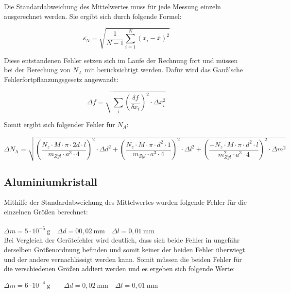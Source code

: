 \documentclass[12pt,a4paper,titlepage,headinclude,bibtotoc]{scrartcl}
\begin{document}
Die Standardabweichung des Mittelwertes muss für jede Messung einzeln ausgerechnet werden. Sie ergibt sich durch folgende Formel:

\begin{equation}
\bar{s_N}=\sqrt{\frac{1}{N-1}\sum_{i=1}^N (x_i -\bar{x})^2}
\end{equation}

Diese entstandenen Fehler setzen sich im Laufe der Rechnung fort und müssen bei der Berechung von $N_A$ mit berücksichtigt werden. Dafür wird das Gauß'sche Fehlerfortpflanzungsgesetz angewandt:

\begin{equation}
\Delta f =\sqrt{\sum_{i} \left( \frac{\delta f}{\delta x_i}\right)^2 \cdot\Delta x^2_i }
\end{equation}

Somit ergibt sich folgender Fehler für $N_A$:

\begin{equation}
\Delta N_\mathrm{A} = \sqrt{\left(\frac{N_z \cdot M \cdot \pi \cdot 2d \cdot l}{m_{Zyl} \cdot a^3 \cdot 4}\right)^2 \cdot \Delta d^2 + \left(\frac{N_z \cdot M \cdot \pi \cdot d^2 \cdot 1}{m_{Zyl} \cdot a^3 \cdot 4}\right)^2 \cdot \Delta l^2 + \left(\frac{-N_z \cdot M \cdot \pi \cdot d^2 \cdot l}{m_{Zyl}^2 \cdot a^3 \cdot 4}\right)^2 \cdot \Delta m^2}
\end{equation}

\subsection{Aluminiumkristall}
 
Mithilfe der Standardabweichung des Mittelwertes wurden folgende Fehler für die einzelnen Größen berechnet:
\\
\\
$\Delta m = 5\cdot10^{-5} \ \mathrm{g} \quad \Delta d= 00,02 \ \mathrm{mm} \quad \Delta l = 0,01\ \mathrm{mm}$\\

\vspace{3mm}
Bei Vergleich der Gerätefehler wird deutlich, dass sich beide Fehler in ungefähr derselben Größenordnung befinden und somit keiner der beiden Fehler überwiegt und der andere vernachlässigt werden kann. Somit müssen die beiden Fehler für die verschiedenen Größen addiert werden und es ergeben sich folgende Werte:

\vspace{3mm} 
$\Delta m =6\cdot 10^{-4}\ \mathrm{g} \qquad\Delta d =0,02\ \mathrm{mm}\quad \Delta l = 0,01\ \mathrm{mm}$
\vspace{3mm}
 
\end{document}
